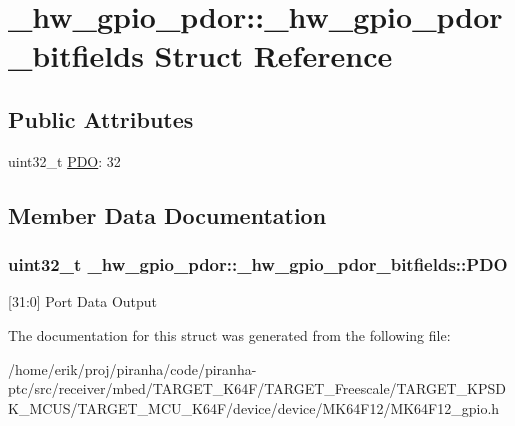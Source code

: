 \hypertarget{struct__hw__gpio__pdor_1_1__hw__gpio__pdor__bitfields}{}\section{\+\_\+hw\+\_\+gpio\+\_\+pdor\+:\+:\+\_\+hw\+\_\+gpio\+\_\+pdor\+\_\+bitfields Struct Reference}
\label{struct__hw__gpio__pdor_1_1__hw__gpio__pdor__bitfields}
\subsection*{Public Attributes}
\begin{DoxyCompactItemize}
\item 
uint32\+\_\+t \hyperlink{struct__hw__gpio__pdor_1_1__hw__gpio__pdor__bitfields_a897e7405ac24e5022f1a1804e36e7f09}{P\+DO}\+: 32
\end{DoxyCompactItemize}


\subsection{Member Data Documentation}
\subsubsection[{\texorpdfstring{P\+DO}{PDO}}]{\setlength{\rightskip}{0pt plus 5cm}uint32\+\_\+t \+\_\+hw\+\_\+gpio\+\_\+pdor\+::\+\_\+hw\+\_\+gpio\+\_\+pdor\+\_\+bitfields\+::\+P\+DO}\hypertarget{struct__hw__gpio__pdor_1_1__hw__gpio__pdor__bitfields_a897e7405ac24e5022f1a1804e36e7f09}{}\label{struct__hw__gpio__pdor_1_1__hw__gpio__pdor__bitfields_a897e7405ac24e5022f1a1804e36e7f09}
\mbox{[}31\+:0\mbox{]} Port Data Output 

The documentation for this struct was generated from the following file\+:\begin{DoxyCompactItemize}
\item 
/home/erik/proj/piranha/code/piranha-\/ptc/src/receiver/mbed/\+T\+A\+R\+G\+E\+T\+\_\+\+K64\+F/\+T\+A\+R\+G\+E\+T\+\_\+\+Freescale/\+T\+A\+R\+G\+E\+T\+\_\+\+K\+P\+S\+D\+K\+\_\+\+M\+C\+U\+S/\+T\+A\+R\+G\+E\+T\+\_\+\+M\+C\+U\+\_\+\+K64\+F/device/device/\+M\+K64\+F12/M\+K64\+F12\+\_\+gpio.\+h\end{DoxyCompactItemize}
